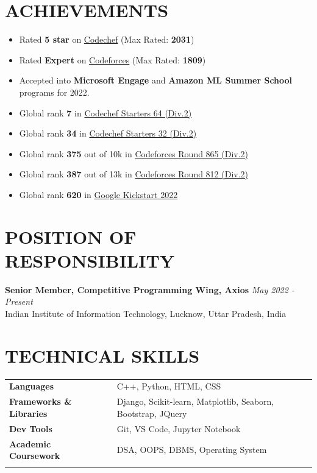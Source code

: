 \documentclass[12pt]{article}
\begin{document}
\section*{ACHIEVEMENTS}
\begin{itemize}[leftmargin=*, topsep=1pt, itemsep=1pt, partopsep=1pt, parsep=2pt]
	\item Rated \textbf{5 star} on \href{https://www.codechef.com/users/prabhav7}{Codechef} (Max Rated: \textbf{2031})
	\item Rated \textbf{Expert} on \href{https://codeforces.com/profile/prabhavagrawal7}{Codeforces} (Max Rated: \textbf{1809})
	\item Accepted into \textbf{Microsoft Engage} and \textbf{Amazon ML Summer School} programs for 2022.
	\item Global rank \textbf{7} in \href{https://www.codechef.com/rankings/START64B?search=prabhav7}{Codechef Starters 64 (Div.2)}
	\item Global rank \textbf{34} in \href{https://www.codechef.com/rankings/START32B?search=prabhav7}{Codechef Starters 32 (Div.2)}
	\item Global rank \textbf{375} out of 10k in \href{https://codeforces.com/contest/1816/standings/participant/153555638#p153555638}{Codeforces Round 865 (Div.2)}
	\item Global rank \textbf{387} out of 13k in \href{https://codeforces.com/contest/1713/standings/participant/137877142#p137877142}{Codeforces Round 812 (Div.2)}
	\item Global rank \textbf{620} in \href{https://codingcompetitions.withgoogle.com/kickstart/certificate/summary/00000000008caba4}{Google Kickstart 2022}
\end{itemize}

\section*{POSITION OF RESPONSIBILITY}
\textbf{Senior Member, Competitive Programming Wing, Axios} \hfill \textit{May 2022 - Present} \\
Indian Institute of Information Technology, Lucknow, Uttar Pradesh, India

\section*{TECHNICAL SKILLS}
\begin{tabular}{@{}llll}
	\textbf{Languages}               && C++, Python, HTML, CSS                                               		\\
	\textbf{Frameworks \& Libraries} && Django, Scikit-learn, Matplotlib, Seaborn, Bootstrap, JQuery \\
	\textbf{Dev Tools}               && Git, VS Code, Jupyter Notebook                                              \\
	\textbf{Academic Coursework}     && DSA, OOPS, DBMS, Operating System                                           \\
	\vspace{-\topsep}
\end{tabular}
\end{document}
